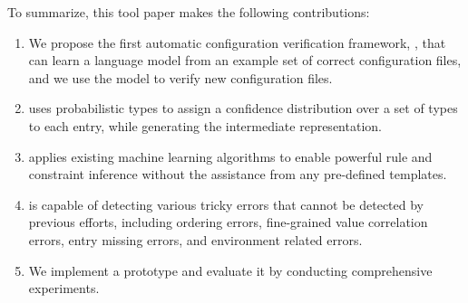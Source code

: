 To summarize, this tool paper makes the following contributions:

\begin{enumerate}

\item We propose the first automatic configuration verification
framework, \app, that can learn a language model from an example set of 
correct configuration files, and we use the model to verify 
new configuration files.
 
\item \app uses probabilistic types to assign a confidence 
distribution over a set of types to each entry, 
while generating the intermediate representation. 

\item \app applies existing machine learning algorithms to 
enable powerful rule and constraint inference without the assistance 
from any pre-defined templates.

\item \app is capable of detecting various tricky errors that cannot
be detected by previous efforts,
including ordering errors, fine-grained value correlation errors, 
entry missing errors, and environment related errors. 

\item We implement a \app prototype and evaluate it by
conducting comprehensive experiments.

\end{enumerate}
